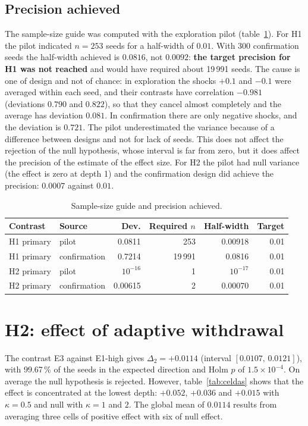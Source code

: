 \subsection{Precision achieved}

The sample-size guide was computed with the exploration pilot (table~\ref{tab:muestra}). For H1 the pilot indicated $n=253$ seeds for a half-width of $0.01$. With 300 confirmation seeds the half-width achieved is $0.0816$, not $0.0092$: \textbf{the target precision for H1 was not reached} and would have required about 19\,991 seeds. The cause is one of design and not of chance: in exploration the shocks $+0.1$ and $-0.1$ were averaged within each seed, and their contrasts have correlation $-0.981$ (deviations $0.790$ and $0.822$), so that they cancel almost completely and the average has deviation $0.081$. In confirmation there are only negative shocks, and the deviation is $0.721$. The pilot underestimated the variance because of a difference between designs and not for lack of seeds. This does not affect the rejection of the null hypothesis, whose interval is far from zero, but it does affect the precision of the estimate of the effect size. For H2 the pilot had null variance (the effect is zero at depth 1) and the confirmation design did achieve the precision: $0.0007$ against $0.01$.

\begin{table}[htbp]
\centering
\caption{Sample-size guide and precision achieved.}
\label{tab:muestra}
\small
\begin{tabular}{@{}llrrrr@{}}
\toprule
Contrast & Source & Dev. & Required $n$ & Half-width & Target \\
\midrule
H1 primary & pilot & 0.0811 & 253 & 0.00918 & 0.01 \\
H1 primary & confirmation & 0.7214 & 19\,991 & 0.0816 & 0.01 \\
H2 primary & pilot & $10^{-16}$ & 1 & $10^{-17}$ & 0.01 \\
H2 primary & confirmation & 0.00615 & 2 & 0.00070 & 0.01 \\
\bottomrule
\end{tabular}
\end{table}

\section{H2: effect of adaptive withdrawal}
\label{sec:res-h2}

The contrast E3 against E1-high gives $\Delta_2=+0.0114$ (interval $[0.0107,\,0.0121]$), with 99.67\,\% of the seeds in the expected direction and Holm $p$ of $1.5\times10^{-4}$. On average the null hypothesis is rejected. However, table~\ref{tab:celdas} shows that the effect is concentrated at the lowest depth: $+0.052$, $+0.036$ and $+0.015$ with $\kappa=0.5$ and null with $\kappa=1$ and $2$. The global mean of $0.0114$ results from averaging three cells of positive effect with six of null effect.

